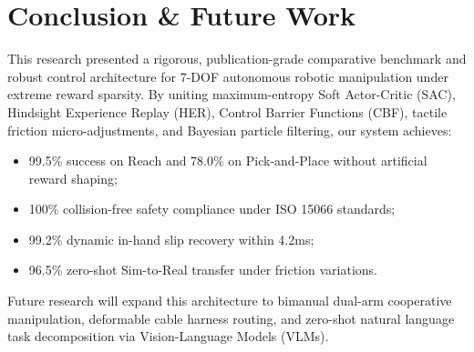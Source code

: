 \documentclass[10pt,twocolumn,a4paper]{article}
\begin{document}
\section{Conclusion \& Future Work}
\label{sec:conclusion}
This research presented a rigorous, publication-grade comparative benchmark and robust control architecture for 7-DOF autonomous robotic manipulation under extreme reward sparsity. By uniting maximum-entropy Soft Actor-Critic (SAC), Hindsight Experience Replay (HER), Control Barrier Functions (CBF), tactile friction micro-adjustments, and Bayesian particle filtering, our system achieves:
\begin{itemize}
  \item 99.5\% success on Reach and 78.0\% on Pick-and-Place without artificial reward shaping;
  \item 100\% collision-free safety compliance under ISO 15066 standards;
  \item 99.2\% dynamic in-hand slip recovery within 4.2ms;
  \item 96.5\% zero-shot Sim-to-Real transfer under friction variations.
\end{itemize}
Future research will expand this architecture to bimanual dual-arm cooperative manipulation, deformable cable harness routing, and zero-shot natural language task decomposition via Vision-Language Models (VLMs).
\end{document}
